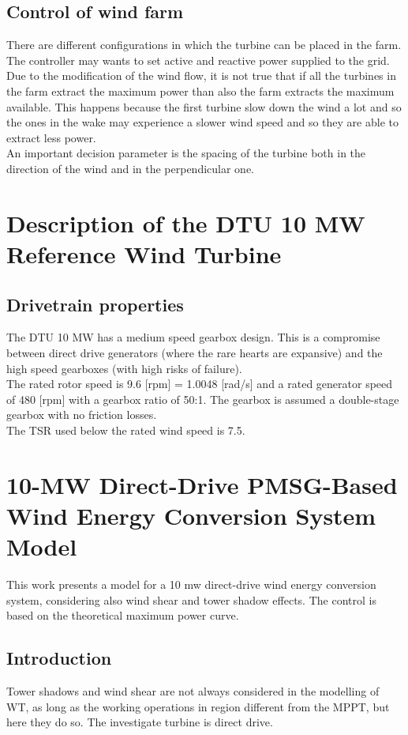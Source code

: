 \documentclass[]{article}
\begin{document}
\subsection{Control of wind farm}
There are different configurations in which the turbine can be placed in the farm. \\
The controller may wants to set active and reactive power supplied to the grid.\\
Due to the modification of the wind flow, it is not true that if all the turbines in the farm extract the maximum power than also the farm extracts the maximum available. This happens because the first turbine slow down the wind a lot and so the ones in the wake may experience a slower wind speed and so they are able to extract less power.\\
An important decision parameter is the spacing of the turbine both in the direction of the wind and in the perpendicular one. 
\newpage
\section{Description of the DTU 10 MW Reference Wind Turbine}
\subsection{Drivetrain properties}
The DTU 10 MW has a medium speed gearbox design. This is a compromise between direct drive generators (where the rare hearts are expansive) and the high speed gearboxes (with high risks of failure).\\
The rated rotor speed is 9.6 [rpm] = 1.0048 [rad/s] and a rated generator speed of 480 [rpm] with a gearbox ratio of 50:1. The gearbox is assumed a double-stage gearbox with no friction losses.  \\
The TSR used below the rated wind speed is 7.5.
\newpage
\section{10-MW Direct-Drive PMSG-Based Wind Energy Conversion System Model}
This work presents a model for a 10 mw direct-drive wind energy conversion system, considering also wind shear and tower shadow effects. The control is based on the theoretical maximum power curve.\\
\subsection{Introduction}
Tower shadows and wind shear are not always considered in the modelling of WT, as long as the working operations in region different from the MPPT, but here they do so. The investigate turbine is direct drive.
\end{document}
